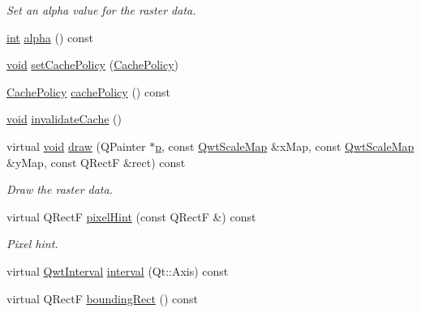 \begin{DoxyCompactItemize}
\begin{DoxyCompactList}\small\item\em Set an alpha value for the raster data. \end{DoxyCompactList}\item 
\hyperlink{ioapi_8h_a787fa3cf048117ba7123753c1e74fcd6}{int} \hyperlink{class_qwt_plot_raster_item_a96b2faa0bc0fe086bff1abe72bcb2016}{alpha} () const 
\item 
\hyperlink{group___u_a_v_objects_plugin_ga444cf2ff3f0ecbe028adce838d373f5c}{void} \hyperlink{class_qwt_plot_raster_item_a31f74199f7e333c2683b0f18289e4c7f}{set\-Cache\-Policy} (\hyperlink{class_qwt_plot_raster_item_a94929fc4c31c3dab75ee5adcac2d57b0}{Cache\-Policy})
\item 
\hyperlink{class_qwt_plot_raster_item_a94929fc4c31c3dab75ee5adcac2d57b0}{Cache\-Policy} \hyperlink{class_qwt_plot_raster_item_ac953db5d88084f416b4dbc3ca8a323f3}{cache\-Policy} () const 
\item 
\hyperlink{group___u_a_v_objects_plugin_ga444cf2ff3f0ecbe028adce838d373f5c}{void} \hyperlink{class_qwt_plot_raster_item_a547ce4d8d031b230226cfbd509ef65b5}{invalidate\-Cache} ()
\item 
virtual \hyperlink{group___u_a_v_objects_plugin_ga444cf2ff3f0ecbe028adce838d373f5c}{void} \hyperlink{class_qwt_plot_raster_item_a2bb321c1ddc67b96a54a266ba27e6fe0}{draw} (Q\-Painter $\ast$\hyperlink{glext_8h_aa5367c14d90f462230c2611b81b41d23}{p}, const \hyperlink{class_qwt_scale_map}{Qwt\-Scale\-Map} \&x\-Map, const \hyperlink{class_qwt_scale_map}{Qwt\-Scale\-Map} \&y\-Map, const Q\-Rect\-F \&rect) const 
\begin{DoxyCompactList}\small\item\em Draw the raster data. \end{DoxyCompactList}\item 
virtual Q\-Rect\-F \hyperlink{class_qwt_plot_raster_item_a03a69bfe7d3d125ba4f580d1ecd5e2f4}{pixel\-Hint} (const Q\-Rect\-F \&) const 
\begin{DoxyCompactList}\small\item\em Pixel hint. \end{DoxyCompactList}\item 
virtual \hyperlink{class_qwt_interval}{Qwt\-Interval} \hyperlink{class_qwt_plot_raster_item_a0ffa377f71d05a0d3d077e040b08c357}{interval} (Qt\-::\-Axis) const 
\item 
virtual Q\-Rect\-F \hyperlink{class_qwt_plot_raster_item_ad96073173caf80301e108a6d8b0648e9}{bounding\-Rect} () const 
\end{DoxyCompactItemize}
